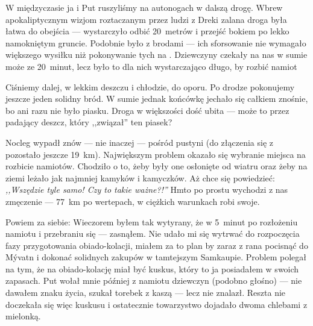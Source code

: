 W międzyczasie ja i Put ruszyliśmy na autonogach w dalszą drogę. Wbrew apokaliptycznym wizjom roztaczanym przez ludzi z Dreki zalana droga była łatwa do obejścia --- wystarczyło odbić 20~metrów i przejść bokiem po lekko namokniętym gruncie. Podobnie było z brodami --- ich sforsowanie nie wymagało większego wysiłku niż pokonywanie tych na . Dziewczyny czekały na nas w sumie może ze 20~minut, lecz było to dla nich wystarczająco długo, by rozbić namiot \tongue

Ciśniemy dalej, w lekkim deszczu i chłodzie, do oporu. Po drodze pokonujemy jeszcze jeden solidny bród. W sumie jednak końcówkę jechało się całkiem znośnie, bo ani razu nie było piasku. Droga w większości dość ubita --- może to przez padający deszcz, który ,,związał'' ten piasek?


Nocleg wypadł znów --- nie inaczej --- pośród pustyni (do złączenia się z  pozostało jeszcze 19~km). Największym problem okazało się wybranie miejsca na rozbicie namiotów. Chodziło o to, żeby były one osłonięte od wiatru oraz żeby na ziemi leżało jak najmniej kamyków i kamyczków. Aż chce się powiedzieć: \emph{,,Wszędzie tyle samo! Czy to takie ważne?!''} Hm\textellipsis to po prostu wychodzi z nas zmęczenie --- 77~km po wertepach, w ciężkich warunkach robi swoje.

Powiem za siebie: Wieczorem byłem tak wytyrany, że w 5~minut po rozłożeniu namiotu i przebraniu się --- zasnąłem. Nie udało mi się wytrwać do rozpoczęcia fazy przygotowania obiado-kolacji, miałem za to plan by zaraz z rana pocisnąć do Mývatn i dokonać solidnych zakupów w tamtejszym Samkaupie. Problem polegał na tym, że na obiado-kolację miał być kuskus, który to ja posiadałem w swoich zapasach. Put wołał mnie później z namiotu dziewczyn (podobno głośno) --- nie dawałem zna\-ku życia, szukał torebek z kaszą --- lecz nie znalazł. Reszta nie doczekała się więc kuskusu i ostatecznie towarzystwo dojadało dwoma chlebami z mielonką.
